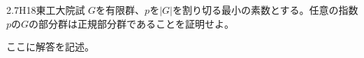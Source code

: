 \begin{prob}{2.7}{}{H18東工大院試}
$G$を有限群、$p$を$|G|$を割り切る最小の素数とする。任意の指数$p$の$G$の部分群は正規部分群であることを証明せよ。
\end{prob}

ここに解答を記述。
